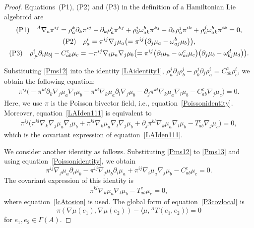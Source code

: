 \documentclass[10pt,a4paper]{article}
\numberwithin{equation}{section}
\begin{document}
\begin{proof}
Equations~(P1), (P2) and (P3) in the definition of a Hamiltonian Lie algebroid are
\begin{gather}
{\rm (P1)} \quad {}^A \nabla_a \pi^{ij}
= \rho_a^k \partial_k \pi^{ij} - \partial_k \rho^i_a \pi^{kj}
+ \rho^i_b \omega^b_{ak} \pi^{kj}
- \partial_k \rho^j_a \pi^{ik}
+ \rho^j_b \omega^b_{ak} \pi^{ik} = 0,\nonumber\\
{\rm (P2)} \quad
\rho^i_a = \pi^{ij} \nabla_j \mu_a
\bigl(= \pi^{ij} \bigl(\partial_j \mu_a - \omega_{aj}^b \mu_b\bigr)\bigr),
\label{Pms12}\\
{\rm (P3)}\quad
\rho^i_{[a} \partial_i \mu_{b]} - C_{ab}^c \mu_c
= - \pi^{ij} \nabla_i \mu_a \nabla_j \mu_b
\bigl(= \pi^{ij} \bigl(\partial_i \mu_a - \omega_{ai}^c \mu_c\bigr)
\bigl(\partial_j \mu_b - \omega_{bj}^d \mu_d\bigr)\bigr).
\label{Pms13}
\end{gather}

Substituting \eqref{Pms12} into the identity \eqref{LAidentity1},
$\rho_a^j \partial_j \rho_{b}^i - \rho_b^j \partial_j \rho_{a}^i = C_{ab}^c \rho_c^i$,
we obtain the following equation:
\begin{gather}
 \pi^{ij} \bigl(-\pi^{kl} \partial_k \nabla_j \mu_a \nabla_l \mu_b
- \pi^{kl} \nabla_k \mu_a \partial_l \nabla_j \mu_b
- \partial_j \pi^{kl} \nabla_k \mu_a \nabla_l \mu_b
- C_{ab}^c \nabla_j \mu_c\bigr)=0.
\label{LAIden111}
\end{gather}
Here, we use $\pi$ is the Poisson bivector field, i.e.,
equation~\eqref{Poissonidentity}.
Moreover, equation~\eqref{LAIden111} is equivalent to
\begin{gather}
\pi^{ij} \bigl(\pi^{kl} \nabla_k \nabla_j \mu_a \nabla_l \mu_b
+ \pi^{kl} \nabla_k \mu_a \nabla_l \nabla_j \mu_b
+ \partial_j \pi^{kl} \nabla_k \mu_a \nabla_l \mu_b
- T_{ab}^c \nabla_j \mu_c\bigr)=0,
\label{identity11}
\end{gather}
which is the covariant expression of equation~\eqref{LAIden111}.

We consider another identity as follows.
Substituting \eqref{Pms12} to \eqref{Pms13}
and using equation~\eqref{Poissonidentity},
we obtain
\[%
 \pi^{ij} \nabla_j \mu_a \partial_i \mu_b
- \pi^{ij} \nabla_j \mu_b \partial_i \mu_a
+ \pi^{ij} \nabla_i \mu_a \nabla_j \mu_b
- C_{ab}^c \mu_c=0.
\]
The covariant expression of this identity is
\begin{gather}
\pi^{kl} \nabla_k \mu_a \nabla_l \mu_b
- T_{ab}^c \mu_c=0,
\label{P3covlocal}
\end{gather}
where equation~\eqref{lcAtosion} is used.
The global form of equation~\eqref{P3covlocal} is
\[
\pi(\nabla \mu(e_1), \nabla \mu(e_2))
- \big\langle\mu,{}^A T(e_1, e_2)\big\rangle = 0
\]
for $e_1, e_2 \in \Gamma(A)$.


\end{proof}
\end{document}
